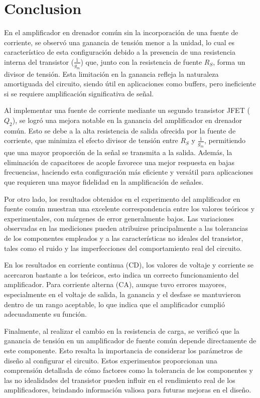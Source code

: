 \documentclass[journal]{IEEEtran}
\begin{document}
	\section{Conclusion}
	\par En el amplificador en drenador común sin la incorporación de una fuente de corriente, se observó una ganancia de tensión menor a la unidad, lo cual es característico de esta configuración debido a la presencia de una resistencia interna del transistor ($\frac{1}{g_m}$) que, junto con la resistencia de fuente $R_S$, forma un divisor de tensión. Esta limitación en la ganancia refleja la naturaleza amortiguada del circuito, siendo útil en aplicaciones como buffers, pero ineficiente si se requiere amplificación significativa de señal.
	\par Al implementar una fuente de corriente mediante un segundo transistor JFET ($Q_2$), se logró una mejora notable en la ganancia del amplificador en drenador común. Esto se debe a la alta resistencia de salida ofrecida por la fuente de corriente, que minimiza el efecto divisor de tensión entre $R_S$ y $\frac{1}{g_m}$, permitiendo que una mayor proporción de la señal se transmita a la salida. Además, la eliminación de capacitores de acople favorece una mejor respuesta en bajas frecuencias, haciendo esta configuración más eficiente y versátil para aplicaciones que requieren una mayor fidelidad en la amplificación de señales.

	\par Por otro lado, los resultados obtenidos en el experimento del amplificador en fuente común muestran una excelente correspondencia entre los valores teóricos y experimentales, con márgenes de error generalmente bajos. Las variaciones observadas en las mediciones pueden atribuirse principalmente a las tolerancias de los componentes empleados y a las características no ideales del transistor, tales como el ruido y las imperfecciones del comportamiento real del circuito.

	\par En los resultados en corriente continua (CD), los valores de voltaje y corriente se acercaron bastante a los teóricos, esto indica un correcto funcionamiento del amplificador. Para corriente alterna (CA), aunque tuvo errores mayores, especialmente en el voltaje de salida, la ganancia y el desfase se mantuvieron dentro de un rango aceptable, lo que indica que el amplificador cumplió adecuadamente su función.

	\par Finalmente, al realizar el cambio en la resistencia de carga, se verificó que la ganancia de tensión en un amplificador de fuente común depende directamente de este componente. Esto resalta la importancia de considerar los parámetros de diseño al configurar el circuito. Estos experimentos proporcionan una comprensión detallada de cómo factores como la tolerancia de los componentes y las no idealidades del transistor pueden influir en el rendimiento real de los amplificadores, brindando información valiosa para futuras mejoras en el diseño.
\end{document}
